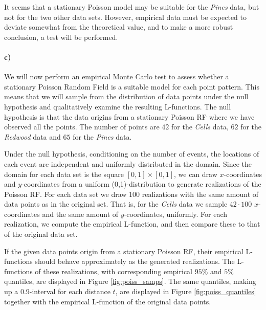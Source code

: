 It seems that a stationary Poisson model may be suitable for the \textit{Pines} data, but not for the two other data sets. However, empirical data must be expected to deviate somewhat from the theoretical value, and to make a more robust conclusion, a test will be performed.

\paragraph{c)}
We will now perform an empirical Monte Carlo test to assess whether a stationary Poisson Random Field is a suitable model for each point pattern. This means that we will sample from the distribution of data points under the null hypothesis and qualitatively examine the resulting L-functions. The null hypothesis is that the data origins from a stationary Poisson RF where we have observed all the points. The number of points are $42$ for the \textit{Cells} data, $62$ for the \textit{Redwood} data and $65$ for the \textit{Pines} data.

Under the null hypothesis, conditioning on the number of events, the locations of each event are independent and uniformly distributed in the domain. Since the domain for each data set is the square $[0,1] \times [0,1]$, we can draw $x$-coordinates and $y$-coordinates from a uniform (0,1)-distribution to generate realizations of the Poisson RF. For each data set we draw $100$ realizations with the same amount of data points as in the original set. That is, for the \textit{Cells} data we sample $42\cdot 100$ $x$-coordinates and the same amount of $y$-coordinates, uniformly. For each realization, we compute the empirical L-function, and then compare these to that of the original data set.

If the given data points origin from a stationary Poisson RF, their empirical L-functions should behave approximately as the generated realizations. The L-functions of these realizations, with corresponding empirical $95\%$ and $5\%$ quantiles, are displayed in Figure \ref{fig:poiss_samps}. The same quantiles, making up a $0.9$-interval for each distance $t$, are displayed in Figure \ref{fig:poiss_quantiles} together with the empirical L-function of the original data points.

